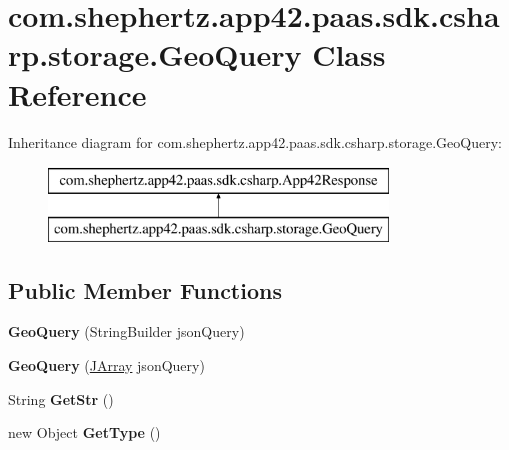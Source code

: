 \hypertarget{classcom_1_1shephertz_1_1app42_1_1paas_1_1sdk_1_1csharp_1_1storage_1_1_geo_query}{\section{com.\+shephertz.\+app42.\+paas.\+sdk.\+csharp.\+storage.\+Geo\+Query Class Reference}
\label{classcom_1_1shephertz_1_1app42_1_1paas_1_1sdk_1_1csharp_1_1storage_1_1_geo_query}
}
Inheritance diagram for com.\+shephertz.\+app42.\+paas.\+sdk.\+csharp.\+storage.\+Geo\+Query\+:\begin{figure}[H]
\begin{center}
\leavevmode
\includegraphics[height=2.000000cm]{classcom_1_1shephertz_1_1app42_1_1paas_1_1sdk_1_1csharp_1_1storage_1_1_geo_query}
\end{center}
\end{figure}
\subsection*{Public Member Functions}
\begin{DoxyCompactItemize}
\item 
\hypertarget{classcom_1_1shephertz_1_1app42_1_1paas_1_1sdk_1_1csharp_1_1storage_1_1_geo_query_ac0bdae6750ffe6367721ca26a483796b}{{\bfseries Geo\+Query} (String\+Builder json\+Query)}\label{classcom_1_1shephertz_1_1app42_1_1paas_1_1sdk_1_1csharp_1_1storage_1_1_geo_query_ac0bdae6750ffe6367721ca26a483796b}

\item 
\hypertarget{classcom_1_1shephertz_1_1app42_1_1paas_1_1sdk_1_1csharp_1_1storage_1_1_geo_query_afdd11ef24bec671aa7ebe58282dd3b6f}{{\bfseries Geo\+Query} (\hyperlink{class_simple_j_s_o_n_1_1_j_array}{J\+Array} json\+Query)}\label{classcom_1_1shephertz_1_1app42_1_1paas_1_1sdk_1_1csharp_1_1storage_1_1_geo_query_afdd11ef24bec671aa7ebe58282dd3b6f}

\item 
\hypertarget{classcom_1_1shephertz_1_1app42_1_1paas_1_1sdk_1_1csharp_1_1storage_1_1_geo_query_a5a1969376c517f7d11529b39f96fd89a}{String {\bfseries Get\+Str} ()}\label{classcom_1_1shephertz_1_1app42_1_1paas_1_1sdk_1_1csharp_1_1storage_1_1_geo_query_a5a1969376c517f7d11529b39f96fd89a}

\item 
\hypertarget{classcom_1_1shephertz_1_1app42_1_1paas_1_1sdk_1_1csharp_1_1storage_1_1_geo_query_a0960389c2ba82c60c3984bbca3f25376}{new Object {\bfseries Get\+Type} ()}\label{classcom_1_1shephertz_1_1app42_1_1paas_1_1sdk_1_1csharp_1_1storage_1_1_geo_query_a0960389c2ba82c60c3984bbca3f25376}

\end{DoxyCompactItemize}
